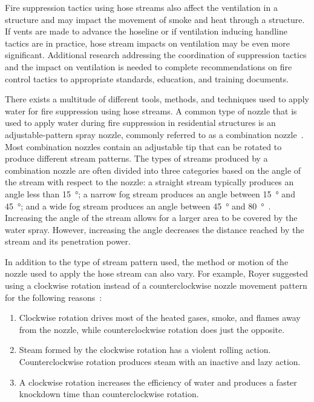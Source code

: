 \documentclass[12pt,oneside]{book}
\begin{document}
Fire suppression tactics using hose streams also affect the ventilation in a structure and may impact the movement of smoke and heat through a structure. If vents are made to advance the hoseline or if ventilation inducing handline tactics are in practice, hose stream impacts on ventilation may be even more significant. Additional research addressing the coordination of suppression tactics and the impact on ventilation is needed to complete recommendations on fire control tactics to appropriate standards, education, and training documents.

There exists a multitude of different tools, methods, and techniques used to apply water for fire suppression using hose streams. A common type of nozzle that is used to apply water during fire suppression in residential structures is an adjustable-pattern spray nozzle, commonly referred to as a combination nozzle~\cite{NFPA_1964}. Most combination nozzles contain an adjustable tip that can be rotated to produce different stream patterns. The types of streams produced by a combination nozzle are often divided into three categories based on the angle of the stream with respect to the nozzle: a straight stream typically produces an angle less than 15\SI{}{\degree}; a narrow fog stream produces an angle between 15\SI{}{\degree} and 45\SI{}{\degree}; and a wide fog stream produces an angle between 45\SI{}{\degree} and 80\SI{}{\degree}~\cite{IFSTA:Essentials_of_FF}. Increasing the angle of the stream allows for a larger area to be covered by the water spray.  However, increasing the angle decreases the distance reached by the stream and its penetration power. 

In addition to the type of stream pattern used, the method or motion of the nozzle used to apply the hose stream can also vary. For example, Royer suggested using a clockwise rotation instead of a counterclockwise nozzle movement pattern for the following reasons~\cite{Royer:ISU}:
\begin{enumerate} 
	\item Clockwise rotation drives most of the heated gases, smoke, and flames away from the nozzle, while counterclockwise rotation does just the opposite.
	\item Steam formed by the clockwise rotation has a violent rolling action. Counterclockwise rotation produces steam with an inactive and lazy action.
	\item A clockwise rotation increases the efficiency of water and produces a faster knockdown time than counterclockwise rotation.
\end{enumerate}
\end{document}
